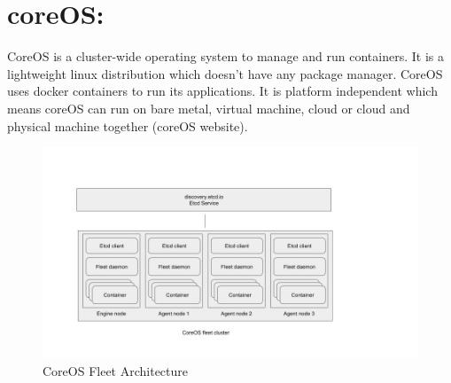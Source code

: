 \section{coreOS:}
\label{sec:fleet}
CoreOS is a cluster-wide operating system to manage and run containers. It is a lightweight linux distribution which doesn't have any package manager. CoreOS uses docker containers to run its applications. It is platform independent which means coreOS can run on bare metal, virtual machine, cloud or cloud and physical machine together (coreOS website).

\begin{figure}
\centering
\includegraphics[scale=0.5]{./fig/fleet}
\caption{CoreOS Fleet Architecture}
\label{fig:fleetArch}
\end{figure}

